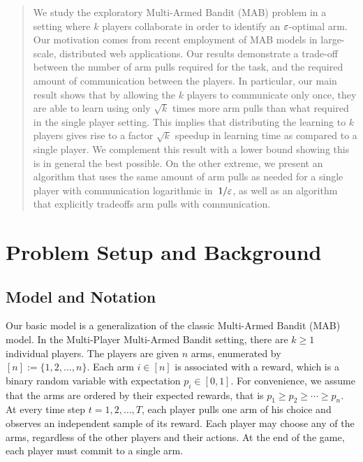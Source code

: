 \documentclass{article}
\begin{document}
\begin{abstract}
We study the exploratory Multi-Armed Bandit (MAB) problem in a setting where $k$ players collaborate in order to identify an $\varepsilon$-optimal arm.
Our motivation comes from recent employment of MAB models in large-scale, distributed web applications.
Our results demonstrate a trade-off between the number of arm pulls required for
the task, and the required amount of communication between the players.
In particular, our main result shows that by allowing the $k$ players to communicate only once, they are able to learn using only $\sqrt{k}$ times more arm pulls than what required in the single player setting. 
This implies that distributing the learning to $k$ players gives rise to a factor $\sqrt{k}$ speedup in learning time as compared to a single player.
We complement this result with a lower bound showing this is in general the best possible. 
On the other extreme, we present an algorithm that uses the same amount of arm pulls as needed for a single player with communication logarithmic in~$1/\varepsilon$, as well as an algorithm that explicitly tradeoffs arm pulls with communication.
\end{abstract}











\section{Problem Setup and Background}
\label{sec:prelims}


\subsection{Model and Notation}

Our basic model is a generalization of the classic Multi-Armed Bandit (MAB) model.
In the Multi-Player Multi-Armed Bandit setting, there are $k \ge 1$ individual players. The players are given $n$ arms, enumerated by $[n] := \{1,2,\ldots,n\}$.
Each arm $i \in [n]$ is associated with a reward, which is a binary random variable with expectation $p_i \in [0,1]$.
For convenience, we assume that the arms are ordered by their expected rewards, that is $p_1 \ge p_2 \ge \cdots \ge p_n$.
At every time step $t=1,2,\ldots,T$, each player pulls one arm of his choice and observes an independent sample of its reward. 
Each player may choose any of the arms, regardless of the other players and their actions.
At the end of the game, each player must commit to a single arm. 
\end{document}

